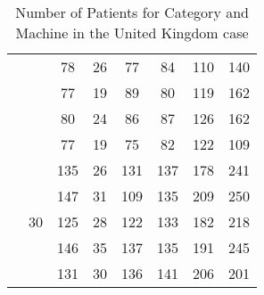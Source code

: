 \begin{table}[h]
\begin{tabular}{cc|c|c|c|c|c|c|}
\multicolumn{1}{|c|}{}                     &                     & 78              & 26            & 77              & 84            & 110             & 140           \\ \cline{3-8} 
\multicolumn{1}{|c|}{}                     &                     & 77              & 19            & 89              & 80            & 119             & 162           \\ \cline{3-8} 
\multicolumn{1}{|c|}{}                     &                     & 80              & 24            & 86              & 87            & 126             & 162           \\ \cline{3-8} 
\multicolumn{1}{|c|}{}                     &                     & 77              & 19            & 75              & 82            & 122             & 109           \\ \cline{2-8} 
\multicolumn{1}{|c|}{}                     & \multirow{5}{*}{30} & 135             & 26            & 131             & 137           & 178             & 241           \\ \cline{3-8} 
\multicolumn{1}{|c|}{}                     &                     & 147             & 31            & 109             & 135           & 209             & 250           \\ \cline{3-8} 
\multicolumn{1}{|c|}{}                     &                     & 125             & 28            & 122             & 133           & 182             & 218           \\ \cline{3-8} 
\multicolumn{1}{|c|}{}                     &                     & 146             & 35            & 137             & 135           & 191             & 245           \\ \cline{3-8} 
\multicolumn{1}{|c|}{}                     &                     & 131             & 30            & 136             & 141           & 206             & 201           \\ \hline
\end{tabular}
\caption{Number of Patients for Category and Machine in the United Kingdom case}
\end{table}